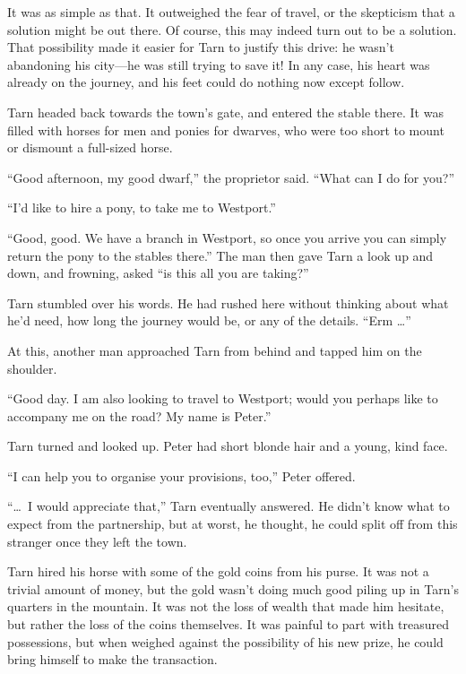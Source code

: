 It was as simple as that.  It outweighed the fear of travel, or the skepticism that a solution might be out there.  Of course, this may indeed turn out to be a solution.  That possibility made it easier for Tarn to justify this drive: he wasn't abandoning his city---he was still trying to save it!  In any case, his heart was already on the journey, and his feet could do nothing now except follow.

Tarn headed back towards the town's gate, and entered the stable there.  It was filled with horses for men and ponies for dwarves, who were too short to mount or dismount a full-sized horse.

``Good afternoon, my good dwarf,'' the proprietor said.  ``What can I do for you?''

``I'd like to hire a pony, to take me to Westport.''

``Good, good.  We have a branch in Westport, so once you arrive you can simply return the pony to the stables there.''  The man then gave Tarn a look up and down, and frowning, asked ``is this all you are taking?''

Tarn stumbled over his words.  He had rushed here without thinking about what he'd need, how long the journey would be, or any of the details.  ``Erm \ldots''

At this, another man approached Tarn from behind and tapped him on the shoulder.

``Good day.  I am also looking to travel to Westport; would you perhaps like to accompany me on the road?  My name is Peter.''

Tarn turned and looked up.  Peter had short blonde hair and a young, kind face.

``I can help you to organise your provisions, too,'' Peter offered.

``\ldots\ I would appreciate that,'' Tarn eventually answered.  He didn't know what to expect from the partnership, but at worst, he thought, he could split off from this stranger once they left the town.

Tarn hired his horse with some of the gold coins from his purse.  It was not a trivial amount of money, but the gold wasn't doing much good piling up in Tarn's quarters in the mountain.  It was not the loss of wealth that made him hesitate, but rather the loss of the coins themselves.  It was painful to part with treasured possessions, but when weighed against the possibility of his new prize, he could bring himself to make the transaction.

